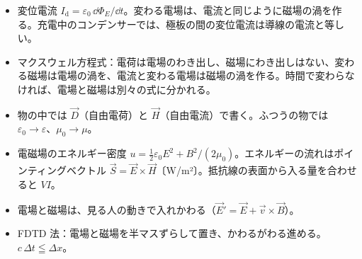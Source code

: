 \begin{taisetsu}
\begin{itemize}[leftmargin=1.2\zw, itemsep=2pt, topsep=0pt, label={\color{bkNavy}●}]\raggedright
\item 変位電流 $I_{\mathrm d}=\varepsilon_0\,\dd\Phi_E/\dd t$。変わる電場は、電流と同じように磁場の渦を作る。充電中のコンデンサーでは、極板の間の変位電流は導線の電流と等しい。
\item マクスウェル方程式：電荷は電場のわき出し、磁場にわき出しはない、変わる磁場は電場の渦を、電流と変わる電場は磁場の渦を作る。時間で変わらなければ、電場と磁場は別々の式に分かれる。
\item 物の中では $\vec D$（自由電荷）と $\vec H$（自由電流）で書く。ふつうの物では $\varepsilon_0\to\varepsilon$、$\mu_0\to\mu$。
\item 電磁場のエネルギー密度 $u=\tfrac12\varepsilon_0E^2+B^2/(2\mu_0)$。エネルギーの流れはポインティングベクトル $\vec S=\vec E\times\vec H$〔W/m²〕。抵抗線の表面から入る量を合わせると $VI$。
\item 電場と磁場は、見る人の動きで入れかわる（$\vec E'=\vec E+\vec v\times\vec B$）。
\item FDTD 法：電場と磁場を半マスずらして置き、かわるがわる進める。$c\,\Delta t\leqq\Delta x$。
\end{itemize}
\end{taisetsu}

\begin{kotoba}\small
{}
\end{kotoba}


